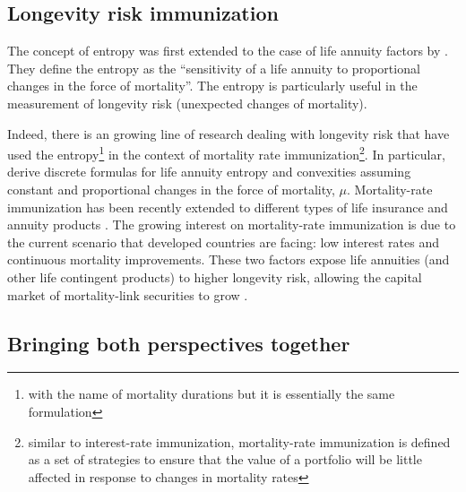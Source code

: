 \documentclass[12pt]{article}
\begin{document}
\subsection*{Longevity risk immunization}



The concept of entropy \citep{leser1955variations,demetrius1974demographic,keyfitz1977difference} was first extended to the case of life annuity factors by \citet{Haberman2011}. They define the entropy as the “sensitivity of a life annuity to proportional changes in the force of mortality”. The entropy is particularly useful in the measurement of longevity risk (unexpected changes of mortality).


Indeed, there is an growing line of research dealing with longevity risk that have used the entropy\footnote{with the name of mortality durations but it is essentially the same formulation} in the context of mortality rate immunization\footnote{similar to interest-rate immunization, mortality-rate immunization is defined as a set of strategies to ensure that the value of a portfolio will be little affected in response to changes in mortality rates}. In particular, \citet{wang2010optimal,tsai2011actuarial,Tsai2013a,Li2011} derive discrete formulas for life annuity entropy and convexities assuming constant and proportional changes in the force of mortality, $\mu$. Mortality-rate immunization has been recently extended to different types of life insurance and annuity products \citep{li2012key,Li2012,Wong2015,Luciano2015,levantesi2018natural}. The growing interest on mortality-rate immunization is due to the current scenario that developed countries are facing: low interest rates and continuous mortality improvements. These two factors expose life annuities (and other life contingent products) to higher longevity risk, allowing the capital market of mortality-link securities to grow \citep{blake2019still}.






\subsection*{Bringing both perspectives together}
\end{document}

